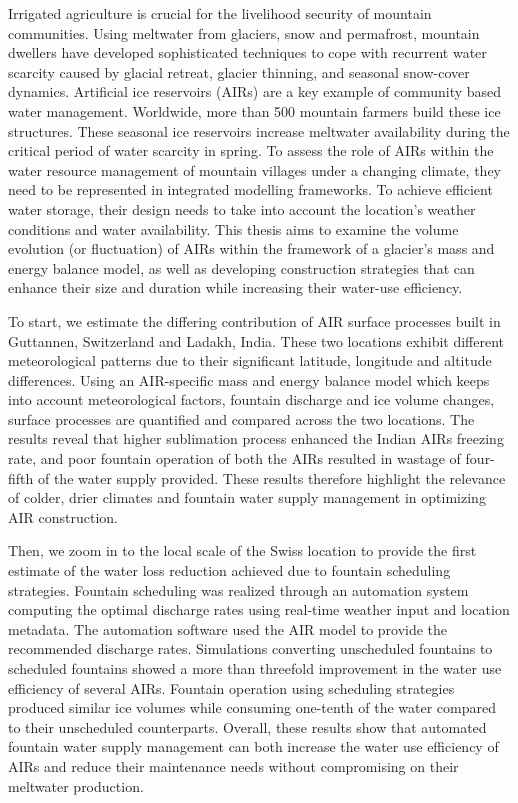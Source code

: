 %
\label{sec:abstract}

Irrigated agriculture is crucial for the livelihood security of mountain communities. Using meltwater from
glaciers, snow and permafrost, mountain dwellers have developed sophisticated techniques to cope with recurrent
water scarcity caused by glacial retreat, glacier thinning, and seasonal snow-cover dynamics. Artificial ice
reservoirs (AIRs) are a key example of community based water management. Worldwide, more than 500 mountain
farmers build these ice structures. These seasonal ice reservoirs increase meltwater availability during the
critical period of water scarcity in spring. To assess the role of AIRs within the water resource management of
mountain villages under a changing climate, they need to be represented in integrated modelling frameworks. To achieve efficient water storage, their design needs to take into account the
location's weather conditions and water availability. This thesis aims to examine the volume evolution (or fluctuation) of AIRs within the framework of a glacier's mass and energy balance model, as well as developing construction strategies that can enhance
their size and duration while increasing their water-use efficiency. 

To start, we estimate the differing contribution of AIR surface processes built in Guttannen, Switzerland and
Ladakh, India. These two locations exhibit different meteorological patterns due to their significant
latitude, longitude and altitude differences. Using an AIR-specific mass and energy balance model which keeps into account meteorological factors, fountain discharge and ice volume changes, surface processes are quantified and compared across
the two locations. The results reveal that higher sublimation process enhanced the Indian AIRs freezing rate, and poor
fountain operation of both the AIRs resulted in wastage of four-fifth of the water supply provided. These results
therefore highlight the relevance of colder, drier climates and fountain water supply management in optimizing  
AIR construction.  

Then, we zoom in to the local scale of the Swiss location to provide the first estimate of the water loss reduction achieved due to
fountain scheduling strategies. Fountain scheduling was realized through an automation system computing the optimal discharge rates using real-time weather input and location metadata. The automation software
used the AIR model to provide the recommended discharge rates. Simulations converting unscheduled fountains to
scheduled fountains showed a more than threefold improvement in the water use efficiency of several AIRs. Fountain operation
using scheduling strategies produced similar ice volumes while consuming one-tenth of the water compared to their unscheduled counterparts.  Overall, these results show that automated fountain water supply management can both increase
the water use efficiency of AIRs and reduce their maintenance needs without compromising on their meltwater
production.

